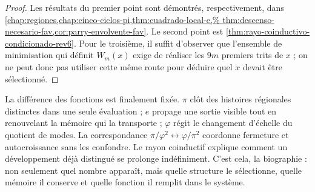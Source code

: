 \begin{proof}
Les résultats du premier point sont démontrés, respectivement, dans
\cref{chap:regiones,chap:cinco-ciclos-pi,thm:cuadrado-local-e,%
thm:descenso-necesario-fav,cor:parry-envolvente-fav}. Le second point est
\cref{thm:rayo-coinductivo-condicionado-rev6}. Pour le troisième, il suffit
d'observer que l'ensemble de minimisation qui définit \(W_m(x)\) exige de
réaliser les \(9m\) premiers trits de \(x\) ; on ne peut donc pas utiliser
cette même route pour déduire quel \(x\) devait être sélectionné.
\end{proof}

La différence des fonctions est finalement fixée. \(\pi\) clôt des
histoires régionales distinctes dans une seule évaluation ; \(e\) propage une
sortie visible tout en renouvelant la mémoire qui la transporte ; \(\varphi\)
régit le changement d'échelle du quotient de modes. La correspondance
\(\pi/\varphi^2\leftrightarrow\varphi/\pi^2\) coordonne fermeture et
autocroissance sans les confondre. Le rayon coinductif explique comment un
développement déjà distingué se prolonge indéfiniment. C'est cela, la biographie :
non seulement quel nombre apparaît, mais quelle structure le sélectionne, quelle mémoire
il conserve et quelle fonction il remplit dans le système.
\fi
